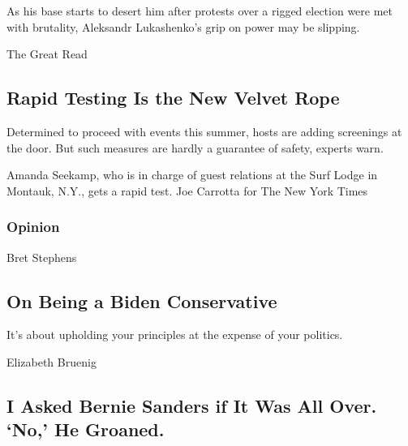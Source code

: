 \href{/2020/08/17/world/europe/belarus-lukashenko-protests.html}{}

As his base starts to desert him after protests over a rigged election
were met with brutality, Aleksandr Lukashenko's grip on power may be
slipping.

\href{/2020/08/16/style/does-rapid-covid-testing-work-weddings-parties.html}{}

The Great Read

\hypertarget{rapid-testing-is-the-new-velvet-rope}{%
\subsection{Rapid Testing Is the New Velvet
Rope}\label{rapid-testing-is-the-new-velvet-rope}}

Determined to proceed with events this summer, hosts are adding
screenings at the door. But such measures are hardly a guarantee of
safety, experts warn.

\href{/2020/08/16/style/does-rapid-covid-testing-work-weddings-parties.html}{}

Amanda Seekamp, who is in charge of guest relations at the Surf Lodge in
Montauk, N.Y., gets a rapid test. Joe Carrotta for The New York Times

\href{https://www.nytimes.com/section/opinion?pagetype=Homepage\&action=click\&module=Opinion}{}

\hypertarget{opinion}{%
\subsubsection{Opinion}\label{opinion}}

\href{/2020/08/17/opinion/joe-biden-conservative-2020.html}{}

Bret Stephens

\hypertarget{on-being-a-biden-conservative}{%
\subsection{On Being a Biden
Conservative}\label{on-being-a-biden-conservative}}

It's about upholding your principles at the expense of your politics.

\href{/2020/08/17/opinion/bernie-sanders-joe-biden.html}{}

Elizabeth Bruenig

\hypertarget{i-asked-bernie-sanders-if-it-was-all-over-no-he-groaned}{%
\subsection{I Asked Bernie Sanders if It Was All Over. `No,' He
Groaned.}\label{i-asked-bernie-sanders-if-it-was-all-over-no-he-groaned}}

